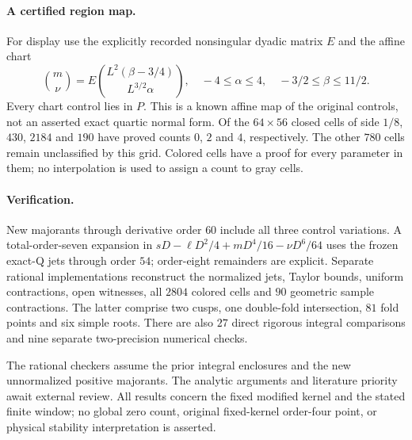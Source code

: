 \paragraph{A certified region map.}
For display use the explicitly recorded nonsingular dyadic matrix $E$
and the affine chart
\[
 \binom{m}{\nu}=E\binom{L^2(\beta-3/4)}{L^{3/2}\alpha},
 \quad -4\leq\alpha\leq4,\quad-3/2\leq\beta\leq11/2.
\]
Every chart control lies in $P$. This is a known affine map of the
original controls, not an asserted exact quartic normal form.
Of the $64\times56$ closed cells of side $1/8$, $430$, $2184$ and
$190$ have proved counts $0$, $2$ and $4$, respectively.
The other $780$ cells remain unclassified by this grid. Colored
cells have a proof for every parameter in them; no interpolation is
used to assign a count to gray cells.

\paragraph{Verification.}
New majorants through derivative order $60$ include all three
control variations. A total-order-seven expansion in
$sD-\ell D^2/4+mD^4/16-\nu D^6/64$ uses the frozen exact-Q
jets through order $54$; order-eight remainders are explicit.
Separate rational implementations reconstruct the normalized jets,
Taylor bounds, uniform contractions, open witnesses, all $2804$
colored cells and $90$ geometric sample contractions. The latter
comprise two cusps, one double-fold intersection, $81$ fold points
and six simple roots. There are also $27$ direct rigorous integral
comparisons and nine separate two-precision numerical checks.

The rational checkers assume the prior integral enclosures and the
new unnormalized positive majorants. The analytic arguments and
literature priority await external review. All results concern the
fixed modified kernel and the stated finite window; no global zero
count, original fixed-kernel order-four point, or physical stability
interpretation is asserted.
